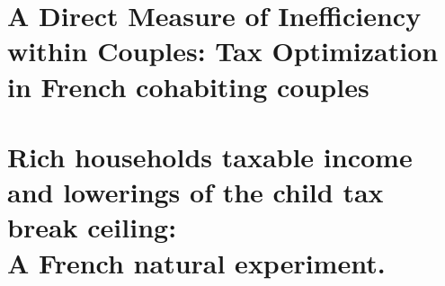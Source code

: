 \chapter[A Direct Measure of Inefficiency within Couples]{A Direct Measure of Inefficiency within Couples:
Tax Optimization in French cohabiting couples\raisebox{.3\baselineskip}{\normalsize\footnotemark}}
\graphicspath{{./2_Cohabiting_couples/figures/}}

\chapter{{\sc Rich households taxable income and lowerings of the child tax
break ceiling: \\ \Large{A French natural experiment.}}}
\graphicspath{{./3_QF_lowering/figures/}}


%






